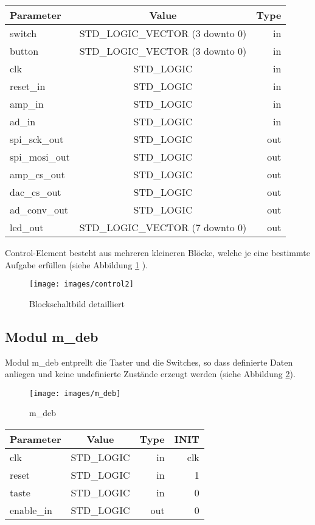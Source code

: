 \begin{table}[H]
	\centering
	\begin{tabular}{|l|c|r|}
		\hline
		\rowcolor{green}Parameter & Value & Type  \\
		\hline
		switch & STD\_LOGIC\_VECTOR (3 downto 0) & in\\
		\hline
		button & STD\_LOGIC\_VECTOR (3 downto 0) & in\\
		\hline
		clk & STD\_LOGIC & in\\
		\hline
		reset\_in & STD\_LOGIC & in\\
		\hline
		amp\_in & STD\_LOGIC & in\\
		\hline
		ad\_in & STD\_LOGIC & in\\
		\hline
		spi\_sck\_out & STD\_LOGIC & out\\
		\hline
		spi\_mosi\_out & STD\_LOGIC & out\\
		\hline
		amp\_cs\_out & STD\_LOGIC & out\\
		\hline	
		dac\_cs\_out & STD\_LOGIC & out\\
		\hline		
		ad\_conv\_out & STD\_LOGIC & out\\
		\hline
		led\_out & STD\_LOGIC\_VECTOR (7 downto 0) & out\\
		\hline
	\end{tabular}
\end{table}

\noindent Control-Element besteht aus mehreren kleineren Blöcke, welche je eine bestimmte Aufgabe erfüllen (siehe Abbildung \ref{fig:control2} ). 

\begin{figure}[H]
\centering
\texttt{[image: images/control2]}
\caption{Blockschaltbild detailliert}
\label{fig:control2}
\end{figure}


\subsection{Modul m\_deb}
Modul m\_deb entprellt die Taster und die Switches, so dass definierte Daten anliegen und keine undefinierte Zustände erzeugt werden (siehe Abbildung \ref{fig:m_deb}).

\begin{figure}[H]
\centering
\texttt{[image: images/m\_deb]}
\caption{m\_deb}
\label{fig:m_deb}
\end{figure}

\begin{table}[H]
	\centering
	\begin{tabular}{|l|c|r|r|}
		\hline
		\rowcolor{green}Parameter & Value & Type & INIT\\
		\hline
		clk & STD\_LOGIC & in & clk\\
		\hline
		reset & STD\_LOGIC & in & 1\\
		\hline
		taste & STD\_LOGIC & in & 0\\
		\hline
		enable\_in & STD\_LOGIC & out & 0\\

		\hline
	\end{tabular}
\end{table}

